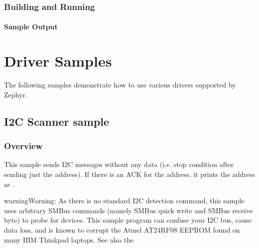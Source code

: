 \documentclass[letterpaper,10pt,english]{sphinxmanual}
\begin{document}
\subsubsection{Building and Running}
\label{\detokenize{samples/sensor/hrs3300/README:building-and-running}}

\paragraph{Sample Output}
\label{\detokenize{samples/sensor/hrs3300/README:sample-output}}

\section{Driver Samples}
\label{\detokenize{samples/drivers/drivers:driver-samples}}\label{\detokenize{samples/drivers/drivers:id1}}\label{\detokenize{samples/drivers/drivers::doc}}
The following samples demonstrate how to use various drivers supported
by Zephyr.


\subsection{I2C Scanner sample}
\label{\detokenize{samples/drivers/ds6_scanner/README:i2c-scanner-sample}}\label{\detokenize{samples/drivers/ds6_scanner/README:i2c-scanner}}\label{\detokenize{samples/drivers/ds6_scanner/README::doc}}

\subsubsection{Overview}
\label{\detokenize{samples/drivers/ds6_scanner/README:overview}}
This sample sends I2C messages without any data (i.e. stop condition
after sending just the address). If there is an ACK for the
address, it prints the address as .

\begin{sphinxadmonition}{warning}{Warning:}
As  there  is  no  standard I2C detection command, this sample
uses arbitrary SMBus commands (namely SMBus quick write and SMBus
receive byte) to probe for devices.  This sample program can confuse
your I2C bus, cause data loss, and is known to corrupt
the Atmel AT24RF08 EEPROM found on many IBM Thinkpad laptops.
See also the 
\end{sphinxadmonition}
\end{document}
